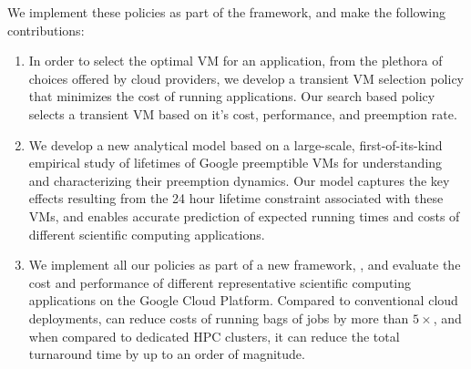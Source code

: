 We implement these policies as part of the \sysname framework, and make the following contributions:
\begin{enumerate}[leftmargin=12pt]
\item In order to select the optimal VM for an application, from the plethora of choices offered by cloud providers, we develop a transient VM selection policy that minimizes the cost of running applications. Our search based policy selects a transient VM based on it's cost, performance, and preemption rate. 

  
\item We develop a new analytical model based on a large-scale, first-of-its-kind empirical study of lifetimes of Google preemptible VMs for understanding and characterizing their preemption dynamics. Our model captures the key effects resulting from the 24 hour lifetime constraint associated with these VMs, and enables accurate prediction of expected running times and costs of different scientific computing applications.
  
\item We implement all our policies as part of a new framework, \sysname, and evaluate the cost and performance of different representative scientific computing  applications on the Google Cloud Platform. Compared to conventional cloud deployments, \sysname can reduce costs of running bags of jobs by more than $5\times$, and when compared to dedicated HPC clusters, it can reduce the total turnaround time by up to an order of magnitude. 

\end{enumerate}

